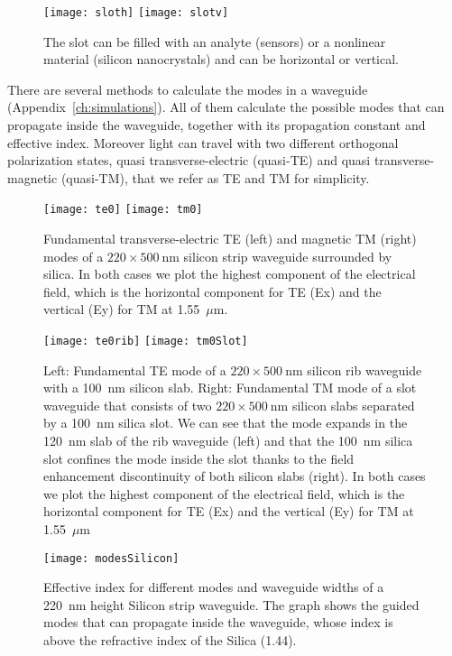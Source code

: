 \begin{figure}[h]
    \centering
    \texttt{[image: sloth]}
    \texttt{[image: slotv]}
    \caption{The slot can be filled with an analyte (sensors) or a nonlinear material (silicon nanocrystals) and can be horizontal or vertical.}
    \label{fig:slotSchematic}
\end{figure}


There are several methods to calculate the modes in a waveguide (Appendix~\ref{ch:simulations}).
All of them calculate the possible modes that can propagate inside the waveguide, together with its propagation constant and effective index.
Moreover light can travel with two different orthogonal polarization states, quasi transverse-electric (quasi-TE) and quasi transverse-magnetic (quasi-TM), that we refer as TE and TM for simplicity.


\begin{figure}[h]
    \centering
    \texttt{[image: te0]}
    \texttt{[image: tm0]}
    \caption{Fundamental transverse-electric TE (left) and magnetic TM (right) modes of a $220\times500~$nm silicon strip waveguide surrounded by silica. In both cases we plot the highest component of the electrical field, which is the horizontal component for TE (Ex) and the vertical (Ey) for TM at 1.55~$\mu$m.}
    \label{fig:modesStrip}
\end{figure}


\begin{figure}[h]
    \centering
    \texttt{[image: te0rib]}
    \texttt{[image: tm0Slot]}
    \caption{Left: Fundamental TE mode of a $220\times500~$nm silicon rib waveguide with a 100~nm silicon slab. Right: Fundamental TM mode of a slot waveguide that consists of two $220\times500~$nm silicon slabs separated by a 100~nm silica slot. We can see that the mode expands in the 120~nm slab of the rib waveguide (left) and that the 100~nm silica slot confines the mode inside the slot thanks to the field enhancement discontinuity of both silicon slabs (right). In both cases we plot the highest component of the electrical field, which is the horizontal component for TE (Ex) and the vertical (Ey) for TM at 1.55~$\mu$m}
    \label{fig:modesRibSlot}
\end{figure}


\begin{figure}[h]
    \centering
    \texttt{[image: modesSilicon]}
    \caption{Effective index for different modes and waveguide widths of a 220~nm height Silicon strip waveguide. The graph shows the guided modes that can propagate inside the waveguide, whose index is above the refractive index of the Silica (1.44).}
    \label{fig:modesSilicon}
\end{figure}


